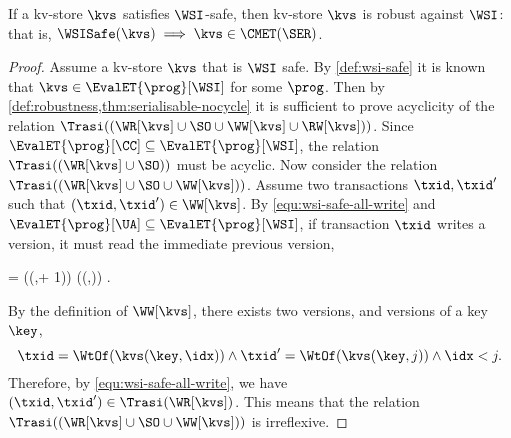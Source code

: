 \begin{theorem}
    If a kv-store \( \kvs \) satisfies \(\WSI\)-safe,
    then kv-store \( \kvs \) is robust against \(\WSI\): that is,
    \(\WSISafe(\kvs) \implies \kvs \in \CMET(\SER) \).
\end{theorem}
\begin{proof}
    Assume a kv-store \( \kvs \) that is \(\WSI\) safe.
    By \cref{def:wsi-safe} it is known that \( \kvs \in \EvalET{\prog}[\WSI]\) for some \( \prog \).
    Then by \cref{def:robustness,thm:serialisable-nocycle} it is sufficient to prove acyclicity of
    the relation \( \Trasi((\WR[\kvs] \cup \SO \cup \WW[\kvs] \cup \RW[\kvs] )) \).
    Since \( \EvalET{\prog}[\CC] \subseteq \EvalET{\prog}[\WSI] \), 
    the relation \( \Trasi((\WR[\kvs] \cup \SO)) \) must be acyclic.
    Now consider the relation \( \Trasi((\WR[\kvs] \cup \SO \cup \WW[\kvs])) \).
    Assume two transactions \( \txid, \txid' \) such that \( (\txid,\txid') \in \WW[\kvs] \).
    By \cref{equ:wsi-safe-all-write} and \( \EvalET{\prog}[\UA] \subseteq \EvalET{\prog}[\WSI] \),
    if transaction \( \txid \) writes a version, it must read the immediate previous version,
    \begin{Formulae}
    \begin{Formula}
        \txid = \WtOf(\kvs(\key,\idx + 1)) \implies \txid \in \RsOf(\kvs(\key,\idx)) .
        \label{equ:wsi-sat-ua} 
    \end{Formula}
    \end{Formulae}
    By the definition of \( \WW[\kvs] \), there exists two versions, 
    \Th{\idx} and  versions of a key \( \key \),
    \[
        \txid = \WtOf(\kvs(\key,\idx)) \land \txid' = \WtOf(\kvs(\key,j)) \land \idx < j .
    \]
    Therefore, by \cref{equ:wsi-safe-all-write}, we have \( ( \txid, \txid' ) \in \Trasi(\WR[\kvs]) \).
    This means that the relation \( \Trasi((\WR[\kvs] \cup \SO \cup \WW[\kvs])) \) is irreflexive.


\end{proof}
